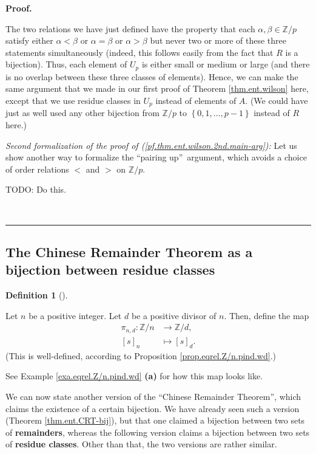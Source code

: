\documentclass[numbers=enddot,12pt,final,onecolumn,notitlepage]{scrartcl}%
\numberwithin{exer}{subsection}
\theoremstyle{definition}
\newtheorem{defi}[theo]{Definition}
\newenvironment{definition}[1][]
{\begin{defi}[#1]\begin{leftbar}}
{\end{leftbar}\end{defi}}
\newenvironment{fineprint}{\begin{small}}{\end{small}}
\newenvironment{proof}[1][Proof]{\noindent\textbf{#1.} }{\ \rule{0.5em}{0.5em}}
\begin{document}
\begin{proof}
\begin{fineprint}
The two relations we have just defined have the property that each
$\alpha,\beta\in\mathbb{Z}/p$ satisfy either $\alpha<\beta$ or $\alpha=\beta$
or $\alpha>\beta$ but never two or more of these three statements
simultaneously (indeed, this follows easily from the fact that $R$ is a
bijection). Thus, each element of $U_{p}$ is either small or medium or large
(and there is no overlap between these three classes of elements). Hence, we
can make the same argument that we made in our first proof of Theorem
\ref{thm.ent.wilson} here, except that we use residue classes in $U_{p}$
instead of elements of $A$. (We could have just as well used any other
bijection from $\mathbb{Z}/p$ to $\left\{  0,1,\ldots,p-1\right\}  $ instead
of $R$ here.)

\textit{Second formalization of the proof of
(\ref{pf.thm.ent.wilson.2nd.main-arg}):} Let us show another way to formalize
the \textquotedblleft pairing up\textquotedblright\ argument, which avoids a
choice of order relations $<$ and $>$ on $\mathbb{Z}/p$.

TODO: Do this.
\end{fineprint}
\end{proof}

\subsection{The Chinese Remainder Theorem as a bijection between residue
classes}

\begin{definition}
\label{def.eqrel.Z/n.pind}Let $n$ be a positive integer. Let $d$ be a positive
divisor of $n$. Then, define the map%
\begin{align*}
\pi_{n,d}:\mathbb{Z}/n  &  \rightarrow\mathbb{Z}/d,\\
\left[  s\right]  _{n}  &  \mapsto\left[  s\right]  _{d}.
\end{align*}
(This is well-defined, according to Proposition \ref{prop.eqrel.Z/n.pind.wd}.)
\end{definition}

See Example \ref{exa.eqrel.Z/n.pind.wd} \textbf{(a)} for how this map looks like.

We can now state another version of the \textquotedblleft Chinese Remainder
Theorem\textquotedblright, which claims the existence of a certain bijection.
We have already seen such a version (Theorem \ref{thm.ent.CRT-bij}), but that
one claimed a bijection between two sets of \textbf{remainders}, whereas the
following version claims a bijection between two sets of \textbf{residue
classes}. Other than that, the two versions are rather similar.
\end{document}
